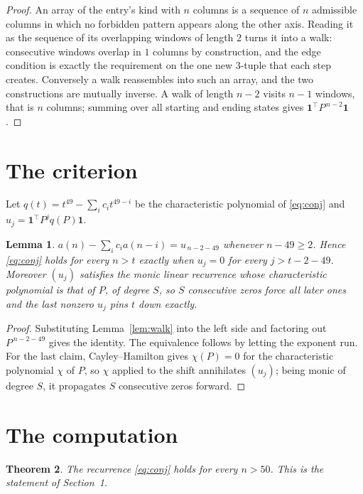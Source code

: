 \documentclass[11pt,a4paper]{article}
\theoremstyle{plain}
\newtheorem{theorem}{Theorem}
\newtheorem{lemma}[theorem]{Lemma}
\theoremstyle{definition}
\begin{document}
\begin{proof}
An array of the entry's kind with $n$ columns is a sequence of $n$ admissible columns in
which no forbidden pattern appears along the other axis. Reading it as the sequence of its
overlapping windows of length $2$ turns it into a walk: consecutive windows overlap in
$1$ columns by construction, and the edge condition is exactly the requirement on the one
new $3$-tuple that each step creates. Conversely a walk reassembles into such an array,
and the two constructions are mutually inverse. A walk of length $n-2$ visits $n-1$
windows, that is $n$ columns; summing over all starting and ending states gives
$\mathbf{1}^{\!\top}P^{\,n-2}\mathbf{1}$.
\end{proof}

\section{The criterion}

Let $q(t)=t^{49}-\sum_i c_i t^{49-i}$ be the characteristic polynomial of
\eqref{eq:conj} and $u_j=\mathbf{1}^{\!\top}P^{j}q(P)\mathbf{1}$.

\begin{lemma}\label{lem:crit}
$a(n)-\sum_i c_i a(n-i)=u_{\,n-2-49}$ whenever $n-49\ge2$. Hence
\eqref{eq:conj} holds for every $n>t$ exactly when $u_j=0$ for every
$j>t-2-49$. Moreover $(u_j)$ satisfies the monic linear recurrence whose
characteristic polynomial is that of $P$, of degree $S$, so $S$ consecutive zeros force all
later ones and the last nonzero $u_j$ pins $t$ down exactly.
\end{lemma}

\begin{proof}
Substituting Lemma~\ref{lem:walk} into the left side and factoring out
$P^{\,n-2-49}$ gives the identity. The equivalence follows by letting the exponent
run. For the last claim, Cayley--Hamilton gives $\chi(P)=0$ for the characteristic
polynomial $\chi$ of $P$, so $\chi$ applied to the shift annihilates $(u_j)$; being monic of
degree $S$, it propagates $S$ consecutive zeros forward.
\end{proof}

\section{The computation}

\begin{theorem}
The recurrence \eqref{eq:conj} holds for every $n>50$. This is the statement of
Section~1.
\end{theorem}
\end{document}
